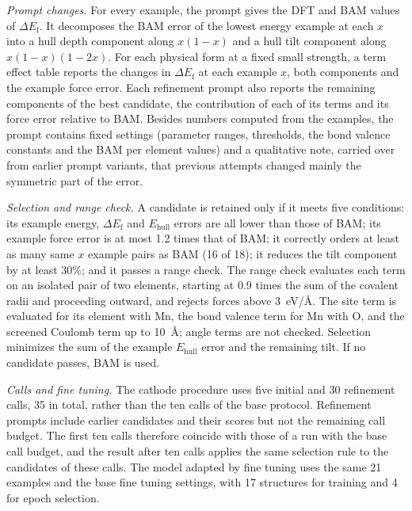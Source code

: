 \textit{Prompt changes.} For every example, the prompt gives the DFT and BAM values of $\Delta E_\mathrm{f}$. It decomposes the BAM error of the lowest energy example at each $x$ into a hull depth component along $x(1-x)$ and a hull tilt component along $x(1-x)(1-2x)$. For each physical form at a fixed small strength, a term effect table reports the changes in $\Delta E_\mathrm{f}$ at each example $x$, both components and the example force error. Each refinement prompt also reports the remaining components of the best candidate, the contribution of each of its terms and its force error relative to BAM. Besides numbers computed from the examples, the prompt contains fixed settings (parameter ranges, thresholds, the bond valence constants and the BAM per element values) and a qualitative note, carried over from earlier prompt variants, that previous attempts changed mainly the symmetric part of the error.

\textit{Selection and range check.} A candidate is retained only if it meets five conditions: its example energy, $\Delta E_\mathrm{f}$ and $E_{\mathrm{hull}}$ errors are all lower than those of BAM; its example force error is at most 1.2 times that of BAM; it correctly orders at least as many same $x$ example pairs as BAM (16 of 18); it reduces the tilt component by at least 30\%; and it passes a range check. The range check evaluates each term on an isolated pair of two elements, starting at 0.9 times the sum of the covalent radii and proceeding outward, and rejects forces above 3~eV/\AA. The site term is evaluated for its element with Mn, the bond valence term for Mn with O, and the screened Coulomb term up to 10~\AA; angle terms are not checked. Selection minimizes the sum of the example $E_{\mathrm{hull}}$ error and the remaining tilt. If no candidate passes, BAM is used.

\textit{Calls and fine tuning.} The cathode procedure uses five initial and 30 refinement calls, 35 in total, rather than the ten calls of the base protocol. Refinement prompts include earlier candidates and their scores but not the remaining call budget. The first ten calls therefore coincide with those of a run with the base call budget, and the result after ten calls applies the same selection rule to the candidates of these calls. The model adapted by fine tuning uses the same 21 examples and the base fine tuning settings, with 17 structures for training and 4 for epoch selection.

